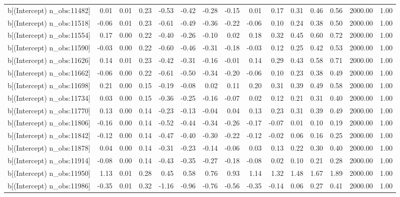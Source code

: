 \begin{table}[ht]
\begin{tabular}{rrrrrrrrrrrrrrr}
  b[(Intercept) n\_obs:11482] & 0.01 & 0.01 & 0.23 & -0.53 & -0.42 & -0.28 & -0.15 & 0.01 & 0.17 & 0.31 & 0.46 & 0.56 & 2000.00 & 1.00 \\ 
  b[(Intercept) n\_obs:11518] & -0.06 & 0.01 & 0.23 & -0.61 & -0.49 & -0.36 & -0.22 & -0.06 & 0.10 & 0.24 & 0.38 & 0.50 & 2000.00 & 1.00 \\ 
  b[(Intercept) n\_obs:11554] & 0.17 & 0.00 & 0.22 & -0.40 & -0.26 & -0.10 & 0.02 & 0.18 & 0.32 & 0.45 & 0.60 & 0.72 & 2000.00 & 1.00 \\ 
  b[(Intercept) n\_obs:11590] & -0.03 & 0.00 & 0.22 & -0.60 & -0.46 & -0.31 & -0.18 & -0.03 & 0.12 & 0.25 & 0.42 & 0.53 & 2000.00 & 1.00 \\ 
  b[(Intercept) n\_obs:11626] & 0.14 & 0.01 & 0.23 & -0.42 & -0.31 & -0.16 & -0.01 & 0.14 & 0.29 & 0.43 & 0.58 & 0.71 & 2000.00 & 1.00 \\ 
  b[(Intercept) n\_obs:11662] & -0.06 & 0.00 & 0.22 & -0.61 & -0.50 & -0.34 & -0.20 & -0.06 & 0.10 & 0.23 & 0.38 & 0.49 & 2000.00 & 1.00 \\ 
  b[(Intercept) n\_obs:11698] & 0.21 & 0.00 & 0.15 & -0.19 & -0.08 & 0.02 & 0.11 & 0.20 & 0.31 & 0.39 & 0.49 & 0.58 & 2000.00 & 1.00 \\ 
  b[(Intercept) n\_obs:11734] & 0.03 & 0.00 & 0.15 & -0.36 & -0.25 & -0.16 & -0.07 & 0.02 & 0.12 & 0.21 & 0.31 & 0.40 & 2000.00 & 1.00 \\ 
  b[(Intercept) n\_obs:11770] & 0.13 & 0.00 & 0.14 & -0.23 & -0.13 & -0.04 & 0.04 & 0.13 & 0.23 & 0.31 & 0.39 & 0.49 & 2000.00 & 1.00 \\ 
  b[(Intercept) n\_obs:11806] & -0.16 & 0.00 & 0.14 & -0.52 & -0.44 & -0.34 & -0.26 & -0.17 & -0.07 & 0.01 & 0.10 & 0.19 & 2000.00 & 1.00 \\ 
  b[(Intercept) n\_obs:11842] & -0.12 & 0.00 & 0.14 & -0.47 & -0.40 & -0.30 & -0.22 & -0.12 & -0.02 & 0.06 & 0.16 & 0.25 & 2000.00 & 1.00 \\ 
  b[(Intercept) n\_obs:11878] & 0.04 & 0.00 & 0.14 & -0.31 & -0.23 & -0.14 & -0.06 & 0.03 & 0.13 & 0.22 & 0.30 & 0.40 & 2000.00 & 1.00 \\ 
  b[(Intercept) n\_obs:11914] & -0.08 & 0.00 & 0.14 & -0.43 & -0.35 & -0.27 & -0.18 & -0.08 & 0.02 & 0.10 & 0.21 & 0.28 & 2000.00 & 1.00 \\ 
  b[(Intercept) n\_obs:11950] & 1.13 & 0.01 & 0.28 & 0.45 & 0.58 & 0.76 & 0.93 & 1.14 & 1.32 & 1.48 & 1.67 & 1.89 & 2000.00 & 1.00 \\ 
  b[(Intercept) n\_obs:11986] & -0.35 & 0.01 & 0.32 & -1.16 & -0.96 & -0.76 & -0.56 & -0.35 & -0.14 & 0.06 & 0.27 & 0.41 & 2000.00 & 1.00 \\ 

\end{tabular}
\end{table}
